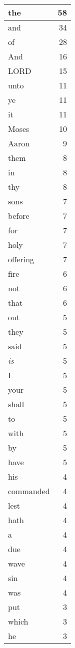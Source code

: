 \begin{center}
\begin{longtable}{l|r}
\hline \hline
\endlastfoot
the & 58 \\ \hline
and & 34 \\ \hline
of & 28 \\ \hline
And & 16 \\ \hline
LORD & 15 \\ \hline
unto & 11 \\ \hline
ye & 11 \\ \hline
it & 11 \\ \hline
Moses & 10 \\ \hline
Aaron & 9 \\ \hline
them & 8 \\ \hline
in & 8 \\ \hline
thy & 8 \\ \hline
sons & 7 \\ \hline
before & 7 \\ \hline
for & 7 \\ \hline
holy & 7 \\ \hline
offering & 7 \\ \hline
fire & 6 \\ \hline
not & 6 \\ \hline
that & 6 \\ \hline
out & 5 \\ \hline
they & 5 \\ \hline
said & 5 \\ \hline
\emph{is} & 5 \\ \hline
I & 5 \\ \hline
your & 5 \\ \hline
shall & 5 \\ \hline
to & 5 \\ \hline
with & 5 \\ \hline
by & 5 \\ \hline
have & 5 \\ \hline
his & 4 \\ \hline
commanded & 4 \\ \hline
lest & 4 \\ \hline
hath & 4 \\ \hline
a & 4 \\ \hline
due & 4 \\ \hline
wave & 4 \\ \hline
sin & 4 \\ \hline
was & 4 \\ \hline
put & 3 \\ \hline
which & 3 \\ \hline
he & 3 \\ \hline

\end{longtable}
\end{center}

